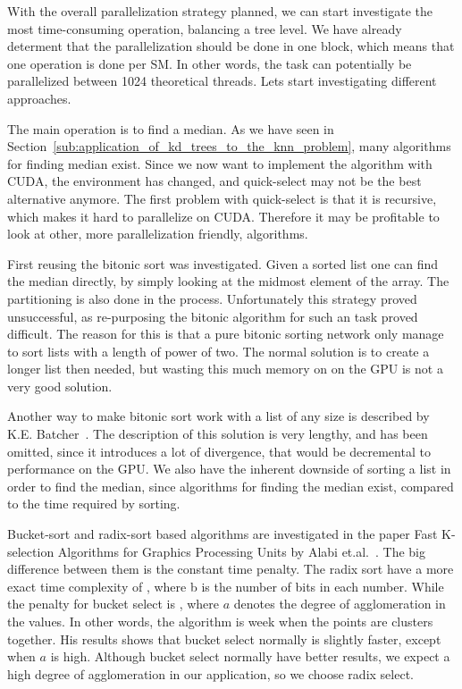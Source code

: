 With the overall parallelization strategy planned, we can start investigate the most time-consuming operation, balancing a tree level. We have already determent that the parallelization should be done in one block, which means that one operation is done per SM\@. In other words, the task can potentially be parallelized between 1024 theoretical threads. Lets start investigating different approaches.

The main operation is to find a median. As we have seen in Section~\ref{sub:application_of_kd_trees_to_the_knn_problem}, many algorithms for finding median exist. Since we now want to implement the algorithm with CUDA, the environment has changed, and quick-select may not be the best alternative anymore. The first problem with quick-select is that it is recursive, which makes it hard to parallelize on CUDA\@. Therefore it may be profitable to look at other, more parallelization friendly, algorithms.

First reusing the bitonic sort was investigated. Given a sorted list one can find the median directly, by simply looking at the midmost element of the array. The partitioning is also done in the process. Unfortunately this strategy proved unsuccessful, as re-purposing the bitonic algorithm for such an task proved difficult. The reason for this is that a pure bitonic sorting network only manage to sort lists with a length of power of two. The normal solution is to create a longer list then needed, but wasting this much memory on on the GPU is not a very good solution. 

Another way to make bitonic sort work with a list of any size is described by K.E. Batcher~\cite{Batcher:1968}. The description of this solution is very lengthy, and has been omitted, since it introduces a lot of divergence, that would be decremental to performance on the GPU\@. We also have the inherent downside of sorting a list in order to find the median, since  algorithms for finding the median exist, compared to the  time required by sorting.

Bucket-sort and radix-sort based algorithms are investigated in the paper Fast K-selection Algorithms for Graphics Processing Units by Alabi et.al\@.~\citep{Alabi:2012}. The big difference between them is the constant time penalty. The radix sort have a more exact time complexity of , where b is the number of bits in each number. While the penalty for bucket select is , where $a$ denotes the degree of agglomeration in the values. In other words, the algorithm is week when the points are clusters together. His results shows that bucket select normally is slightly faster, except when $a$ is high. Although bucket select normally have better results, we expect a high degree of agglomeration in our application, so we choose radix select.

